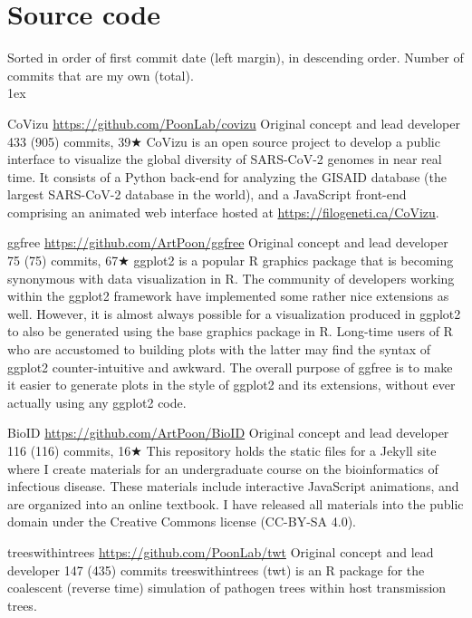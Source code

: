 
\section{Source code}

Sorted in order of first commit date (left margin), in descending order.
Number of commits that are my own (total).\\

\parskip 1ex

{CoVizu}
{\url{https://github.com/PoonLab/covizu}}
{Original concept and lead developer}
{433 (905) commits, 39$\bigstar$}
{CoVizu is an open source project to develop a public interface to visualize the global diversity of SARS-CoV-2 genomes in near real time.
It consists of a Python back-end for analyzing the GISAID database (the largest SARS-CoV-2 database in the world), and a JavaScript front-end comprising an animated web interface hosted at \url{https://filogeneti.ca/CoVizu}.}


{ggfree}
{\url{https://github.com/ArtPoon/ggfree}}
{Original concept and lead developer}
{75 (75) commits, 67$\bigstar$}
{ggplot2 is a popular R graphics package that is becoming synonymous with data visualization in R. The community of developers working within the ggplot2 framework have implemented some rather nice extensions as well. However, it is almost always possible for a visualization produced in ggplot2 to also be generated using the base graphics package in R. Long-time users of R who are accustomed to building plots with the latter may find the syntax of ggplot2 counter-intuitive and awkward. The overall purpose of ggfree is to make it easier to generate plots in the style of ggplot2 and its extensions, without ever actually using any ggplot2 code.}

{BioID}
{\url{https://github.com/ArtPoon/BioID}}
{Original concept and lead developer}
{116 (116) commits, 16$\bigstar$}
{This repository holds the static files for a Jekyll site where I create materials for an undergraduate course on the bioinformatics of infectious disease.  These materials include interactive JavaScript animations, and are organized into an online textbook.  I have released all materials into the public domain under the Creative Commons license (CC-BY-SA 4.0).}



{treeswithintrees}
{\url{https://github.com/PoonLab/twt}}
{Original concept and lead developer}
{147 (435) commits}
{treeswithintrees (twt) is an R package for the coalescent (reverse time) simulation of pathogen trees within host transmission trees.}



